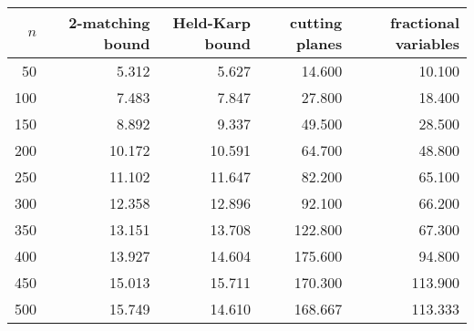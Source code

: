 \documentclass{article}
\begin{document}
\begin{tabular}{|rrrrr|}
\hline
$n$ & 2-matching bound & Held-Karp bound & cutting planes & fractional variables \\
\hline
50 & 5.312 & 5.627 & 14.600 & 10.100 \\
100 & 7.483 & 7.847 & 27.800 & 18.400 \\
150 & 8.892 & 9.337 & 49.500 & 28.500 \\
200 & 10.172 & 10.591 & 64.700 & 48.800 \\
250 & 11.102 & 11.647 & 82.200 & 65.100 \\
300 & 12.358 & 12.896 & 92.100 & 66.200 \\
350 & 13.151 & 13.708 & 122.800 & 67.300 \\
400 & 13.927 & 14.604 & 175.600 & 94.800 \\
450 & 15.013 & 15.711 & 170.300 & 113.900 \\
500 & 15.749 & 14.610 & 168.667 & 113.333 \\
\hline
\end{tabular}
\end{document}
